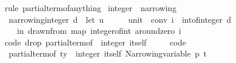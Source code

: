 \begin{isabellebody}
\isatagproof
{}\isamarkupfalse%
\ {\isacharparenleft}{\kern0pt}rule\ partial{\isacharunderscore}{\kern0pt}term{\isacharunderscore}{\kern0pt}of{\isacharunderscore}{\kern0pt}anything{\isacharparenright}{\kern0pt}{\isacharplus}{\kern0pt}%
\endisatagproof
{\isafoldproof}%
%
\isadelimproof
\isanewline
%
\endisadelimproof
\isanewline
{}\isamarkupfalse%
\ integer\ {\isacharcolon}{\kern0pt}{\isacharcolon}{\kern0pt}\ narrowing\isanewline
{}\isanewline
\isanewline
{}\isamarkupfalse%
\isanewline
\ \ {\isachardoublequoteopen}narrowing{\isacharunderscore}{\kern0pt}integer\ d\ {\isacharequal}{\kern0pt}\ {\isacharparenleft}{\kern0pt}let\ {\isacharparenleft}{\kern0pt}u\ {\isacharcolon}{\kern0pt}{\isacharcolon}{\kern0pt}\ {\isacharunderscore}{\kern0pt}\ {\isasymRightarrow}\ {\isacharunderscore}{\kern0pt}\ {\isasymRightarrow}\ unit{\isacharparenright}{\kern0pt}\ {\isacharequal}{\kern0pt}\ conv{\isacharsemicolon}{\kern0pt}\ i\ {\isacharequal}{\kern0pt}\ int{\isacharunderscore}{\kern0pt}of{\isacharunderscore}{\kern0pt}integer\ d\isanewline
\ \ \ \ in\ drawn{\isacharunderscore}{\kern0pt}from\ {\isacharparenleft}{\kern0pt}map\ integer{\isacharunderscore}{\kern0pt}of{\isacharunderscore}{\kern0pt}int\ {\isacharparenleft}{\kern0pt}around{\isacharunderscore}{\kern0pt}zero\ i{\isacharparenright}{\kern0pt}{\isacharparenright}{\kern0pt}{\isacharparenright}{\kern0pt}{\isachardoublequoteclose}\isanewline
\isanewline
{}\isamarkupfalse%
%
\isadelimproof
\ %
\endisadelimproof
%
\isatagproof
\isacommand{{\isachardot}{\kern0pt}{\isachardot}{\kern0pt}}\isamarkupfalse%
%
\endisatagproof
{\isafoldproof}%
%
\isadelimproof
%
\endisadelimproof
\isanewline
\isanewline
{}\isamarkupfalse%
\isanewline
\isanewline
{}\isamarkupfalse%
\ {\isacharbrackleft}{\kern0pt}{\isacharbrackleft}{\kern0pt}code\ drop{\isacharcolon}{\kern0pt}\ {\isachardoublequoteopen}partial{\isacharunderscore}{\kern0pt}term{\isacharunderscore}{\kern0pt}of\ {\isacharcolon}{\kern0pt}{\isacharcolon}{\kern0pt}\ integer\ itself\ {\isasymRightarrow}\ {\isacharunderscore}{\kern0pt}{\isachardoublequoteclose}{\isacharbrackright}{\kern0pt}{\isacharbrackright}{\kern0pt}\ \ \isanewline
\isanewline
{}\isamarkupfalse%
\ {\isacharbrackleft}{\kern0pt}code{\isacharbrackright}{\kern0pt}{\isacharcolon}{\kern0pt}\isanewline
\ \ {\isachardoublequoteopen}partial{\isacharunderscore}{\kern0pt}term{\isacharunderscore}{\kern0pt}of\ {\isacharparenleft}{\kern0pt}ty\ {\isacharcolon}{\kern0pt}{\isacharcolon}{\kern0pt}\ integer\ itself{\isacharparenright}{\kern0pt}\ {\isacharparenleft}{\kern0pt}Narrowing{\isacharunderscore}{\kern0pt}variable\ p\ t{\isacharparenright}{\kern0pt}\ {\isasymequiv}\isanewline

\end{isabellebody}
